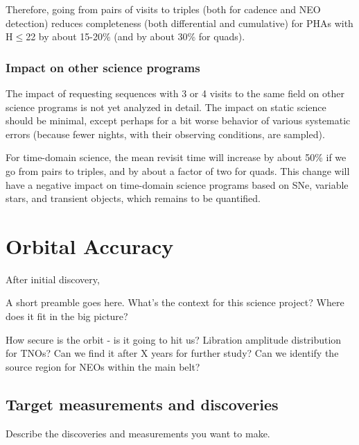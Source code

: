 Therefore, going from pairs of visits to triples (both for cadence and
NEO detection) reduces completeness (both differential and cumulative)
for PHAs with H$\le$22 by about 15-20\% (and by about 30\% for quads).


\subsubsection{Impact on other science programs}

The impact of requesting sequences with 3 or 4 visits to the same
field on other science programs is not yet analyzed in detail.  The
impact on static science should be minimal, except perhaps for a bit
worse behavior of various systematic errors (because fewer nights,
with their observing conditions, are sampled).

For time-domain science, the mean revisit time will increase by about
50\% if we go from pairs to triples, and by about a factor of two for
quads. This change will have a negative impact on time-domain science
programs based on SNe, variable stars, and transient objects, which
remains to be quantified.

\navigationbar



\section{Orbital Accuracy}
\def\secname{\chpname:orbits}\label{sec:\secname}

After initial discovery,

A short preamble goes here. What's the context for this science
project? Where does it fit in the big picture?

How secure is the orbit - is it going to hit us?
Libration amplitude distribution for TNOs?
Can we find it after X years for further study?
Can we identify the source region for NEOs within the main belt?


\subsection{Target measurements and discoveries}
\label{sec:\secname:targets}

Describe the discoveries and measurements you want to make.

